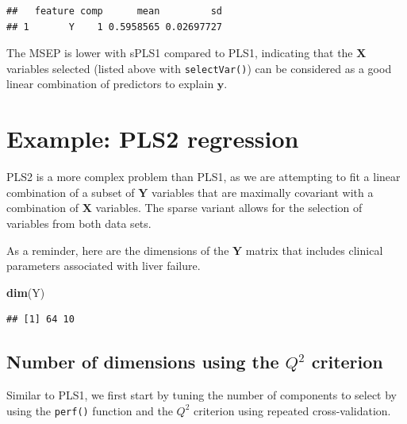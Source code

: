 \documentclass[]{book}
\newenvironment{Shaded}{\begin{snugshade}}{\end{snugshade}}
\newcommand{\KeywordTok}[1]{\textcolor[rgb]{0.13,0.29,0.53}{\textbf{#1}}}
\newcommand{\NormalTok}[1]{#1}
\begin{document}
\begin{verbatim}
##   feature comp      mean         sd
## 1       Y    1 0.5958565 0.02697727
\end{verbatim}

The MSEP is lower with sPLS1 compared to PLS1, indicating that the \(\boldsymbol{X}\) variables selected (listed above with \texttt{selectVar()}) can be considered as a good linear combination of predictors to explain \(\boldsymbol y\).

\hypertarget{example-pls2-regression}{%
\section{Example: PLS2 regression}\label{example-pls2-regression}}

PLS2 is a more complex problem than PLS1, as we are attempting to fit a linear combination of a subset of \(\boldsymbol{Y}\) variables that are maximally covariant with a combination of \(\boldsymbol{X}\) variables. The sparse variant allows for the selection of variables from both data sets.

As a reminder, here are the dimensions of the \(\boldsymbol{Y}\) matrix that includes clinical parameters associated with liver failure.

\begin{Shaded}
\begin{Highlighting}[]
\KeywordTok{dim}\NormalTok{(Y)}
\end{Highlighting}
\end{Shaded}

\begin{verbatim}
## [1] 64 10
\end{verbatim}

\hypertarget{number-of-dimensions-using-the-q2-criterion-1}{%
\subsection{\texorpdfstring{Number of dimensions using the \(Q^2\) criterion}{Number of dimensions using the Q\^{}2 criterion}}\label{number-of-dimensions-using-the-q2-criterion-1}}

Similar to PLS1, we first start by tuning the number of components to select by using the \texttt{perf()} function and the \(Q^2\) criterion using repeated cross-validation.
\end{document}
